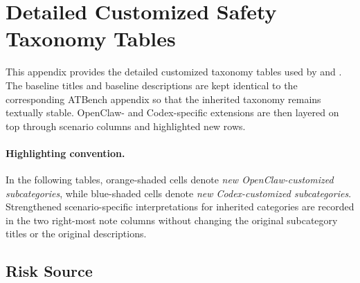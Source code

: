\newcommand{\occustomcell}[1]{\cellcolor{occustom}#1}
\newcommand{\codcustomcell}[1]{\cellcolor{codcustom}#1}
\newcommand{\ocnote}[1]{\textcolor{orange!70!black}{#1}}
\newcommand{\codnote}[1]{\textcolor{HardBlue}{#1}}

\section{Detailed Customized Safety Taxonomy Tables}
\label{app:openclaw_taxonomy}

This appendix provides the detailed customized taxonomy tables used by \toolBenchClaw{} and \toolBenchCodex{}. The baseline titles and baseline descriptions are kept identical to the corresponding ATBench appendix so that the inherited taxonomy remains textually stable. OpenClaw- and Codex-specific extensions are then layered on top through scenario columns and highlighted new rows.

\paragraph{Highlighting convention.}
In the following tables, \colorbox{occustom}{\textcolor{orange!70!black}{orange-shaded cells}} denote \emph{new OpenClaw-customized subcategories}, while \colorbox{codcustom}{\textcolor{HardBlue}{blue-shaded cells}} denote \emph{new Codex-customized subcategories}. Strengthened scenario-specific interpretations for inherited categories are recorded in the two right-most note columns without changing the original subcategory titles or the original descriptions.

\setlength{\LTleft}{0pt}
\setlength{\LTright}{0pt}
\setlength{\LTcapwidth}{\textwidth}
\setlength{\tabcolsep}{3pt}

\subsection{Risk Source}
\label{subsec:openclaw_risk_source_latex}

